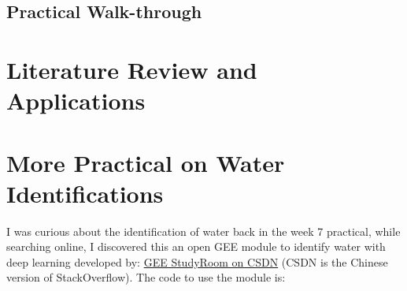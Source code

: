 \documentclass[
  letterpaper,
  DIV=11,
  numbers=noendperiod]{scrreprt}
\begin{document}
\hypertarget{practical-walk-through}{%
\subsection*{Practical Walk-through}\label{practical-walk-through}}

\hypertarget{literature-review-and-applications-3}{%
\section*{Literature Review and
Applications}\label{literature-review-and-applications-3}}


\hypertarget{more-practical-on-water-identifications}{%
\section*{More Practical on Water
Identifications}\label{more-practical-on-water-identifications}}


I was curious about the identification of water back in the week 7
practical, while searching online, I discovered this an open GEE module
to identify water with deep learning developed by:
\href{https://blog.csdn.net/adhuahd/category_11656718.html}{GEE
StudyRoom on CSDN} (CSDN is the Chinese version of StackOverflow). The
code to use the module is:
\end{document}
